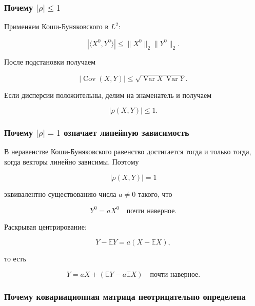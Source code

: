 \documentclass[
  11pt,
  a4paper,
]{article}
\begin{document}
\subsubsection{\texorpdfstring{Почему
\(|\rho|\le1\)}{Почему \textbar\textbackslash rho\textbar\textbackslash le1}}\label{ux43fux43eux447ux435ux43cux443-rhole1}

Применяем Коши-Буняковского в \(L^2\):

\[
|\langle X^0,Y^0\rangle|
\le
\|X^0\|_2\|Y^0\|_2.
\]

После подстановки получаем

\[
|\operatorname{Cov}(X,Y)|
\le
\sqrt{\operatorname{Var}X\,\operatorname{Var}Y}.
\]

Если дисперсии положительны, делим на знаменатель и получаем

\[
|\rho(X,Y)|\le1.
\]

\subsubsection{\texorpdfstring{Почему \(|\rho|=1\) означает линейную
зависимость}{Почему \textbar\textbackslash rho означает линейную зависимость}}\label{ux43fux43eux447ux435ux43cux443-rho1-ux43eux437ux43dux430ux447ux430ux435ux442-ux43bux438ux43dux435ux439ux43dux443ux44e-ux437ux430ux432ux438ux441ux438ux43cux43eux441ux442ux44c}

В неравенстве Коши-Буняковского равенство достигается тогда и только
тогда, когда векторы линейно зависимы. Поэтому

\[
|\rho(X,Y)|=1
\]

эквивалентно существованию числа \(a\ne0\) такого, что

\[
Y^0=aX^0
\quad\text{почти наверное}.
\]

Раскрывая центрирование:

\[
Y-\mathbb EY=a(X-\mathbb EX),
\]

то есть

\[
Y=aX+(\mathbb EY-a\mathbb EX)
\quad\text{почти наверное}.
\]

\subsubsection{Почему ковариационная матрица неотрицательно
определена}\label{ux43fux43eux447ux435ux43cux443-ux43aux43eux432ux430ux440ux438ux430ux446ux438ux43eux43dux43dux430ux44f-ux43cux430ux442ux440ux438ux446ux430-ux43dux435ux43eux442ux440ux438ux446ux430ux442ux435ux43bux44cux43dux43e-ux43eux43fux440ux435ux434ux435ux43bux435ux43dux430}
\end{document}
